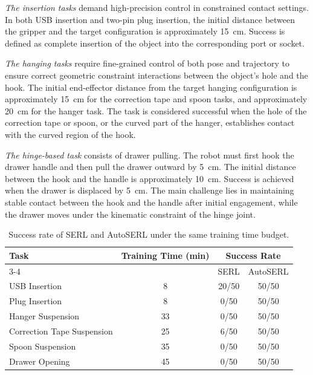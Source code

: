 \documentclass[runningheads]{llncs}
\begin{document}
\textit{The insertion tasks} demand high-precision control in constrained contact 
settings. In both USB insertion and two-pin plug insertion, the initial distance 
between the gripper and the target configuration is approximately 15~cm. 
Success is defined as complete insertion of the object into the corresponding 
port or socket.

\textit{The hanging tasks} require fine-grained control of both pose and trajectory to 
ensure correct geometric constraint interactions between the object's hole and 
the hook. The initial end-effector distance from the target hanging 
configuration is approximately 15~cm for the correction tape and spoon tasks, 
and approximately 20~cm for the hanger task. The task is considered successful 
when the hole of the correction tape or spoon, or the curved part of the 
hanger, establishes contact with the curved region of the hook.

\textit{The hinge-based task} consists of drawer pulling. The robot must first hook the 
drawer handle and then pull the drawer outward by 5~cm. The initial distance 
between the hook and the handle is approximately 10~cm. Success is achieved 
when the drawer is displaced by 5~cm. The main challenge lies in maintaining 
stable contact between the hook and the handle after initial engagement, while 
the drawer moves under the kinematic constraint of the hinge joint.


\begin{table}[t]
\centering
\caption{Success rate of SERL and AutoSERL under the same training time budget.}
\label{tab:serl_autoserl}
\begin{tabular}{l|c|c|c}
\toprule
\multirow{2}{*}{Task} & \multirow{2}{*}{Training Time (min)} & \multicolumn{2}{c}{Success Rate} \\
\cmidrule(lr){3-4}
 &  & SERL & AutoSERL \\
\midrule
USB Insertion & 8  & 20/50 & 50/50 \\
Plug Insertion & 8  & 0/50  & 50/50 \\
Hanger Suspension & 33 & 0/50  & 50/50 \\
Correction Tape Suspension & 25 & 6/50  & 50/50 \\
Spoon Suspension & 35 & 0/50  & 50/50 \\
Drawer Opening & 45 & 0/50  & 50/50 \\
\bottomrule
\end{tabular}
\end{table}
\end{document}
